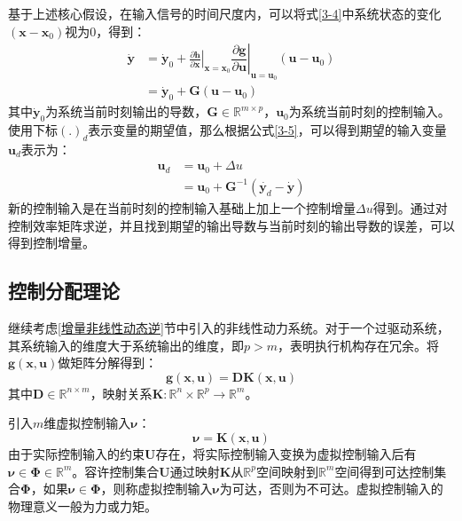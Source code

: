 基于上述核心假设，在输入信号的时间尺度内，可以将式\eqref{3-4}中系统状态的变化$(\boldsymbol{x}-\boldsymbol{x}_0)$视为0，得到：
\begin{equation}
    \begin{aligned}
    \dot{\boldsymbol{y}} &= \dot{\boldsymbol{y}}_0 +  \left.\frac{\partial \boldsymbol{h}}{\partial \boldsymbol{x}}\right|_{\boldsymbol{x}=\boldsymbol{x}_0}\left.\dfrac{\partial \boldsymbol{g}}{\partial \boldsymbol{u}}\right|_{\boldsymbol{u}=\boldsymbol{u}_0}(\boldsymbol{u}-\boldsymbol{u}_0)\\
        &= \dot{\boldsymbol{y}}_0 + \boldsymbol{G}(\boldsymbol{u}-\boldsymbol{u}_0)
    \end{aligned}
    \label{3-5}
\end{equation}
其中$\dot{\boldsymbol{y}}_0$为系统当前时刻输出的导数，$\boldsymbol{G}\in\mathbb{R}^{m\times p}$，$\boldsymbol{u}_0$为系统当前时刻的控制输入。
使用下标$(.)_{d}$表示变量的期望值，那么根据公式\eqref{3-5}，可以得到期望的输入变量$\boldsymbol{u}_{d}$表示为：
\begin{equation}
    \begin{aligned}
    \boldsymbol{u}_{d}&=\boldsymbol{u}_{0}+\Delta u\\
    &=\boldsymbol{u}_{0}+\boldsymbol{G}^{-1}(\dot{\boldsymbol{y}_d}-\dot{\boldsymbol{y}})
    \label{3-6}
    \end{aligned}
\end{equation}
新的控制输入是在当前时刻的控制输入基础上加上一个控制增量$\Delta u$得到。通过对控制效率矩阵求逆，并且找到期望的输出导数与当前时刻的输出导数的误差，可以得到控制增量。

\subsection{控制分配理论}

继续考虑\ref{增量非线性动态逆}节中引入的非线性动力系统。对于一个过驱动系统，其系统输入的维度大于系统输出的维度，即$p>m$，表明执行机构存在冗余。将$\boldsymbol{g}(\boldsymbol{x},\boldsymbol{u})$做矩阵分解得到：
\begin{equation}
    \boldsymbol{g}(\boldsymbol{x},\boldsymbol{u})=\boldsymbol{D}\boldsymbol{K}(\boldsymbol{x},\boldsymbol{u})
    \label{3-7}
\end{equation}
其中$\boldsymbol{D}\in\mathbb{R}^{n\times m}$，映射关系$\boldsymbol{K}:\mathbb{R}^n\times\mathbb{R}^p\rightarrow\mathbb{R}^m$。

引入$m$维虚拟控制输入$\boldsymbol{\nu}$：
\begin{equation}
    \boldsymbol{\nu}=\boldsymbol{K}(\boldsymbol{x},\boldsymbol{u})
    \label{3-8}
\end{equation}
由于实际控制输入的约束$\boldsymbol{U}$存在，将实际控制输入变换为虚拟控制输入后有$\boldsymbol{\nu}\in\boldsymbol{\Phi}\in\mathbb{R}^{m}$。容许控制集合$\boldsymbol{U}$通过映射$\boldsymbol{K}$从$\mathbb{R}^{p}$空间映射到$\mathbb{R}^{m}$空间得到可达控制集合$\boldsymbol{\Phi}$，如果$\boldsymbol{\nu}\in\boldsymbol{\Phi}$，则称虚拟控制输入$\boldsymbol{\nu}$为可达，否则为不可达。虚拟控制输入的物理意义一般为力或力矩。

